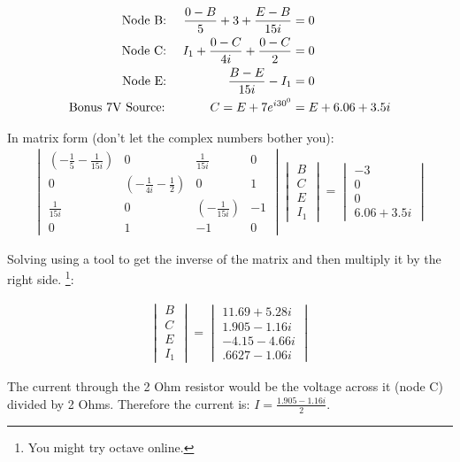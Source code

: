 \documentclass{book}
\numberwithin{equation}{section}
\theoremstyle{definition}
\begin{document}
\begin{align}
\text{Node B: }&&\frac{0-B}{5}+3+\frac{E-B}{15i}&=0 \notag\\
\text{Node C: }&&I_1+\frac{0-C}{4i}+\frac{0-C}{2}&=0\notag\\
\text{Node E: }&&\frac{B-E}{15i}-I_1&=0\notag\\
\text{Bonus 7V Source: }&&C=E+7e^{i30^0}&=E+6.06+3.5i
\end{align}

In matrix form (don't let the complex numbers bother you): 
\begin{align}
\begin{vmatrix}
(-\frac{1}{5}-\frac{1}{15i})	&0	&\frac{1}{15i}	&0\\
0	&(-\frac{1}{4i}-\frac{1}{2})	&0	&1\\
\frac{1}{15i}	&0	&(-\frac{1}{15i}) &-1\\
0	&1	&-1	&0
\end{vmatrix}
\begin{vmatrix}
B\\
C\\
E\\
I_1
\end{vmatrix} =
\begin{vmatrix}
-3\\
0\\
0\\
6.06+3.5i
\end{vmatrix}
\end{align}

Solving using a tool to get the inverse of the matrix and then multiply it by the right side. \footnote{You might try octave online.}:

\begin{align}
\begin{vmatrix}B\\C\\E\\I_1 \end{vmatrix} =
\begin{vmatrix} 11.69+5.28i\\1.905-1.16i \\-4.15-4.66i \\.6627-1.06i \end{vmatrix}
\end{align}

The current through the 2 Ohm resistor would be the voltage across it (node C) divided by 2 Ohms. Therefore the current is: $I=\frac{1.905-1.16i}{2}$. 
\end{document}
